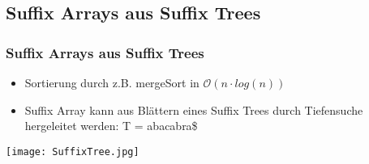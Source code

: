 \documentclass{beamer}
\begin{document}
\subsection{Suffix Arrays aus Suffix Trees}
\begin{frame}
\frametitle{Suffix Arrays aus Suffix Trees} %
\begin{itemize}
\item Sortierung durch z.B. mergeSort in $\mathcal{O}(n\cdot log (n))$
\item Suffix Array kann aus Blättern eines Suffix Trees durch Tiefensuche hergeleitet werden: T = \glqq abacabra\$\grqq\newline
\end{itemize}
\texttt{[image: SuffixTree.jpg]}%
\end{frame}
\end{document}
